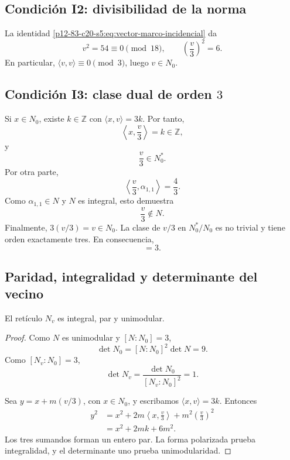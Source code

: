 \subsection{Condición I2: divisibilidad de la norma}

La identidad \eqref{p12-83-c20-s5:eq:vector-marco-incidencial} da
\begin{equation}
 v^2=54\equiv0\pmod{18},
 \qquad
 \left(\frac v3\right)^2=6.
 \label{p12-83-c20-s5:eq:condicion-i2-vecino}
\end{equation}
En particular, \(\langle v,v\rangle\equiv0\pmod3\), luego
\(v\in N_0\).

\subsection{Condición I3: clase dual de orden \(3\)}

Si \(x\in N_0\), existe \(k\in\mathbb Z\) con
\(\langle x,v\rangle=3k\). Por tanto,
\[
 \left\langle x,\frac v3\right\rangle=k\in\mathbb Z,
\]
y
\begin{equation}
 \frac v3\in N_0^*.
 \label{p12-83-c20-s5:eq:v-tercio-en-dual-nucleo}
\end{equation}
Por otra parte,
\[
 \left\langle\frac v3,\alpha_{1,1}\right\rangle=\frac43.
\]
Como \(\alpha_{1,1}\in N\) y \(N\) es integral, esto demuestra
\begin{equation}
 \frac v3\notin N.
 \label{p12-83-c20-s5:eq:v-tercio-no-en-niemeier}
\end{equation}
Finalmente, \(3(v/3)=v\in N_0\). La clase de \(v/3\) en
\(N_0^*/N_0\) es no trivial y tiene orden exactamente tres. En
consecuencia,
\begin{equation}
 [N_v:N_0]=3.
 \label{p12-83-c20-s5:eq:indice-extension-vecino}
\end{equation}

\subsection{Paridad, integralidad y determinante del vecino}

\begin{proposition}
\label{p12-83-c20-s5:prop:estructura-unimodular-vecino}
El retículo \(N_v\) es integral, par y unimodular.
\end{proposition}

\begin{proof}
Como \(N\) es unimodular y \([N:N_0]=3\),
\[
 \det N_0=[N:N_0]^2\det N=9.
\]
Como \([N_v:N_0]=3\),
\[
 \det N_v=\frac{\det N_0}{[N_v:N_0]^2}=1.
\]

Sea \(y=x+m(v/3)\), con \(x\in N_0\), y escribamos
\(\langle x,v\rangle=3k\). Entonces
\begin{align*}
 y^2
 &=x^2+2m\left\langle x,\frac v3\right\rangle
       +m^2\left(\frac v3\right)^2\\
 &=x^2+2mk+6m^2.
\end{align*}
Los tres sumandos forman un entero par. La forma polarizada prueba
integralidad, y el determinante uno prueba unimodularidad.
\end{proof}

